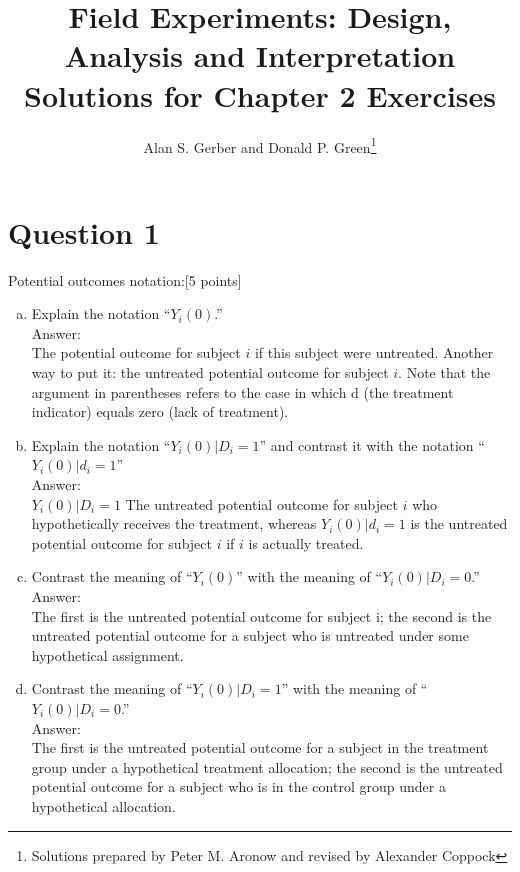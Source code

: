 \documentclass[11pt,notitlepage]{article}\usepackage[]{graphicx}\usepackage[]{color}
\begin{document}
\title{Field Experiments: Design, Analysis and Interpretation \\
Solutions for Chapter 2 Exercises}
\author{Alan S. Gerber and Donald P. Green\footnote{Solutions prepared by Peter M. Aronow and revised by Alexander Coppock}}
\date{\vspace{-5ex}}
\maketitle


\section*{Question 1}
Potential outcomes notation:[5 points]

\begin{enumerate}[a)]
\item Explain the notation ``$Y_{i}(0)$.''\\
Answer:\\
The potential outcome for subject $i$ if this subject were untreated. Another way to put it: the untreated potential outcome for subject $i$. Note that the argument in parentheses refers to the case in which d (the treatment indicator) equals zero (lack of treatment).

\item Explain the notation ``$Y_{i}(0)|D_i=1$'' and contrast it with the notation ``$Y_{i}(0)|d_i=1$''\\
Answer:\\
$Y_{i}(0)|D_i=1$ The untreated potential outcome for subject $i$ who hypothetically receives the treatment, whereas $Y_{i}(0)|d_i=1$ is the untreated potential outcome for subject $i$ if $i$ is actually treated.

\item Contrast the meaning of ``$Y_{i}(0)$'' with the meaning of ``$Y_{i}(0)|D_{i}=0$.''\\
Answer:\\
The first is the untreated potential outcome for subject i; the second is the untreated potential outcome for a subject who is untreated under some hypothetical assignment.

\item Contrast the meaning of ``$Y_{i}(0)|D_{i}=1$'' with the meaning of ``$Y_{i}(0)|D_{i}=0$.'' \\
Answer:\\
The first is the untreated potential outcome for a subject in the treatment group under a hypothetical treatment allocation; the second is the untreated potential outcome for a subject who is in the control group under a hypothetical allocation.


\end{enumerate}
\end{document}

